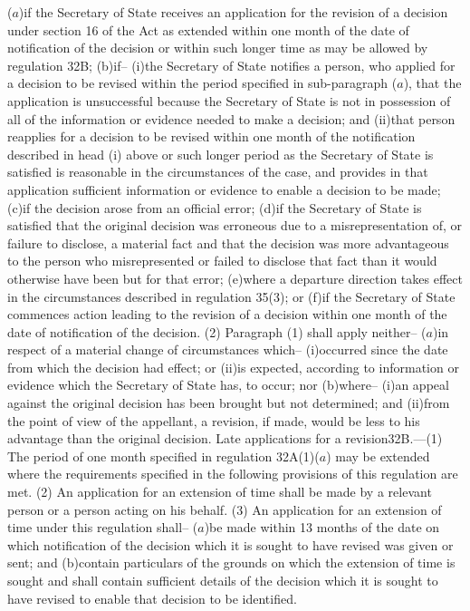 \documentclass[12pt,a4paper]{article}
\begin{document}
($a$)if the Secretary of State receives an application for the revision of a decision under section 16 of the Act as extended within one month of the date of notification of the decision or within such longer time as may be allowed by regulation 32B;
(b)if–
(i)the Secretary of State notifies a person, who applied for a decision to be revised within the period specified in sub-paragraph ($a$), that the application is unsuccessful because the Secretary of State is not in possession of all of the information or evidence needed to make a decision; and
(ii)that person reapplies for a decision to be revised within one month of the notification described in head (i) above or such longer period as the Secretary of State is satisfied is reasonable in the circumstances of the case, and provides in that application sufficient information or evidence to enable a decision to be made;
(c)if the decision arose from an official error;
(d)if the Secretary of State is satisfied that the original decision was erroneous due to a misrepresentation of, or failure to disclose, a material fact and that the decision was more advantageous to the person who misrepresented or failed to disclose that fact than it would otherwise have been but for that error;
(e)where a departure direction takes effect in the circumstances described in regulation 35(3); or
(f)if the Secretary of State commences action leading to the revision of a decision within one month of the date of notification of the decision.
(2) Paragraph (1) shall apply neither–
($a$)in respect of a material change of circumstances which–
(i)occurred since the date from which the decision had effect; or
(ii)is expected, according to information or evidence which the Secretary of State has, to occur; nor
(b)where–
(i)an appeal against the original decision has been brought but not determined; and
(ii)from the point of view of the appellant, a revision, if made, would be less to his advantage than the original decision.
Late applications for a revision32B.—(1) The period of one month specified in regulation 32A(1)($a$) may be extended where the requirements specified in the following provisions of this regulation are met.
(2) An application for an extension of time shall be made by a relevant person or a person acting on his behalf.
(3) An application for an extension of time under this regulation shall–
($a$)be made within 13 months of the date on which notification of the decision which it is sought to have revised was given or sent; and
(b)contain particulars of the grounds on which the extension of time is sought and shall contain sufficient details of the decision which it is sought to have revised to enable that decision to be identified.
\end{document}
